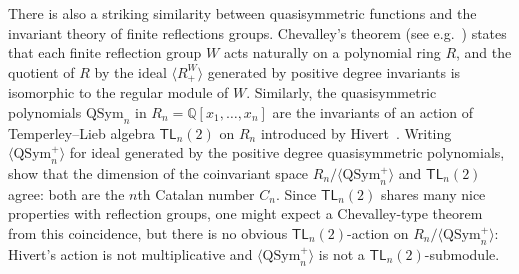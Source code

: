 \documentclass[12pt]{amsart}
\theoremstyle{definition}
\theoremstyle{remark}
\numberwithin{equation}{section}
\newcommand{\QQ}{\mathbb{Q}}
\newcommand{\TL}{\mathsf{TL}}
\newcommand{\QSym}{\mathrm{QSym}}
\begin{document}
There is also a striking similarity between quasisymmetric functions and the invariant theory of finite reflections groups.  
Chevalley's theorem (see e.g.~\cite{Humphrey}) states that each finite reflection group $W$ acts naturally on a polynomial ring $R$, and the quotient of $R$ by the ideal $\langle R_{+}^{W} \rangle$ generated by positive degree invariants is isomorphic to the regular module of $W$.  
Similarly, the quasisymmetric polynomials $\QSym_{n}$ in $R_{n} = \QQ[x_{1}, \ldots, x_{n}]$ are the invariants of an action of  Temperley--Lieb algebra $\TL_{n}(2)$ on $R_{n}$  introduced by Hivert~\cite{Hivert}.  
Writing $\langle \QSym_{n}^{+} \rangle$
for ideal generated by the positive degree quasisymmetric polynomials,~\cite{AB,ABB} show that the dimension of the coinvariant space $R_{n}\big/\langle \QSym_{n}^{+} \rangle$ and $\TL_{n}(2)$ agree: both are the $n$th Catalan number $C_{n}$.  
Since $\TL_{n}(2)$ shares many nice properties with reflection groups, one might expect a Chevalley-type theorem from this coincidence, but there is no obvious $\TL_{n}(2)$-action on $R_{n}\big/\langle \QSym_{n}^{+} \rangle$:  Hivert's action is not multiplicative and $\langle \QSym_{n}^{+} \rangle$ is not a $\TL_{n}(2)$-submodule.  
\end{document}
